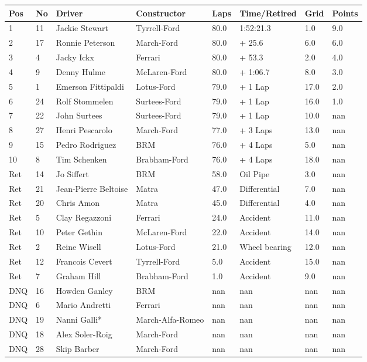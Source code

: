 \documentclass{article}
\begin{document}
\begin{tabular}{llllllll}
\toprule
Pos & No & Driver & Constructor & Laps & Time/Retired & Grid & Points \\
\midrule
1 & 11 & Jackie Stewart & Tyrrell-Ford & 80.0 & 1:52:21.3 & 1.0 & 9.0 \\
2 & 17 & Ronnie Peterson & March-Ford & 80.0 & + 25.6 & 6.0 & 6.0 \\
3 & 4 & Jacky Ickx & Ferrari & 80.0 & + 53.3 & 2.0 & 4.0 \\
4 & 9 & Denny Hulme & McLaren-Ford & 80.0 & + 1:06.7 & 8.0 & 3.0 \\
5 & 1 & Emerson Fittipaldi & Lotus-Ford & 79.0 & + 1 Lap & 17.0 & 2.0 \\
6 & 24 & Rolf Stommelen & Surtees-Ford & 79.0 & + 1 Lap & 16.0 & 1.0 \\
7 & 22 & John Surtees & Surtees-Ford & 79.0 & + 1 Lap & 10.0 & nan \\
8 & 27 & Henri Pescarolo & March-Ford & 77.0 & + 3 Laps & 13.0 & nan \\
9 & 15 & Pedro Rodriguez & BRM & 76.0 & + 4 Laps & 5.0 & nan \\
10 & 8 & Tim Schenken & Brabham-Ford & 76.0 & + 4 Laps & 18.0 & nan \\
Ret & 14 & Jo Siffert & BRM & 58.0 & Oil Pipe & 3.0 & nan \\
Ret & 21 & Jean-Pierre Beltoise & Matra & 47.0 & Differential & 7.0 & nan \\
Ret & 20 & Chris Amon & Matra & 45.0 & Differential & 4.0 & nan \\
Ret & 5 & Clay Regazzoni & Ferrari & 24.0 & Accident & 11.0 & nan \\
Ret & 10 & Peter Gethin & McLaren-Ford & 22.0 & Accident & 14.0 & nan \\
Ret & 2 & Reine Wisell & Lotus-Ford & 21.0 & Wheel bearing & 12.0 & nan \\
Ret & 12 & Francois Cevert & Tyrrell-Ford & 5.0 & Accident & 15.0 & nan \\
Ret & 7 & Graham Hill & Brabham-Ford & 1.0 & Accident & 9.0 & nan \\
DNQ & 16 & Howden Ganley & BRM & nan & nan & nan & nan \\
DNQ & 6 & Mario Andretti & Ferrari & nan & nan & nan & nan \\
DNQ & 19 & Nanni Galli* & March-Alfa-Romeo & nan & nan & nan & nan \\
DNQ & 18 & Alex Soler-Roig & March-Ford & nan & nan & nan & nan \\
DNQ & 28 & Skip Barber & March-Ford & nan & nan & nan & nan \\
\bottomrule
\end{tabular}
\end{document}
